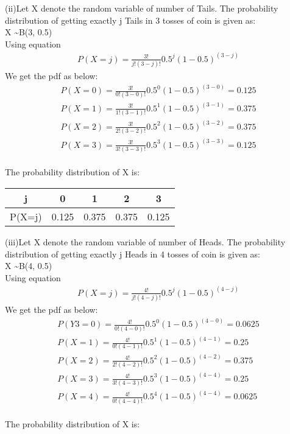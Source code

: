 \documentclass[journal,12pt,twocolumn]{IEEEtran}
\begin{document}
(ii)Let X denote the random variable of number of Tails.
The probability distribution of getting exactly j Tails in 3 tosses of coin is given as:
\\X \textasciitilde B(3, 0.5) 
\\Using equation 
\begin{align}
    P(X = j) = \frac{3!}{j!(3-j)!} { 0.5^j (1-0.5)^{(3-j)}}
\end{align}
We get the pdf as below:
\begin{align}
    P(X=0) = \frac{3!}{0!(3-0)!} { 0.5^0 (1-0.5)^{(3-0)}}
    =0.125
    \\P(X=1) = \frac{3!}{1!(3-1)!} { 0.5^1 (1-0.5)^{(3-1)}} = 0.375
    \\P(X=2) = \frac{3!}{2!(3-2)!} { 0.5^2 (1-0.5)^{(3-2)}} = 0.375
    \\P(X=3) = \frac{3!}{3!(3-3)!} { 0.5^3 (1-0.5)^{(3-3)}} = 0.125
\end{align}
\\The probability distribution of X is: 

\begin{center}
\begin{tabular}{ |c|c|c|c|c| } 
 \hline
 j & 0 & 1 & 2 & 3 \\ \hline
 P(X=j) & 0.125& 0.375 & 0.375 & 0.125 \\ 
 \hline
\end{tabular}
\end{center}
(iii)Let X denote the random variable of number of Heads.
The probability distribution of getting exactly j Heads in 4 tosses of coin is given as:
\\X \textasciitilde B(4, 0.5) 
\\Using equation 
\begin{align}
    P(X = j) = \frac{4!}{j!(4-j)!} { 0.5^j (1-0.5)^{(4-j)}}
\end{align}
We get the pdf as below:
\begin{align}
    P(Y3=0) = \frac{4!}{0!(4-0)!} { 0.5^0 (1-0.5)^{(4-0)}}
    =0.0625
    \\P(X=1) = \frac{4!}{0!(4-1)!} { 0.5^1 (1-0.5)^{(4-1)}} = 0.25
    \\P(X=2) = \frac{4!}{2!(4-2)!} { 0.5^2 (1-0.5)^{(4-2)}} = 0.375
    \\P(X=3) = \frac{4!}{3!(4-3)!} { 0.5^3 (1-0.5)^{(4-4)}} = 0.25
    \\P(X=4) = \frac{4!}{0!(4-4)!} { 0.5^4 (1-0.5)^{(4-4)}} = 0.0625
\end{align}
\\The probability distribution of X is: 
\end{document}
